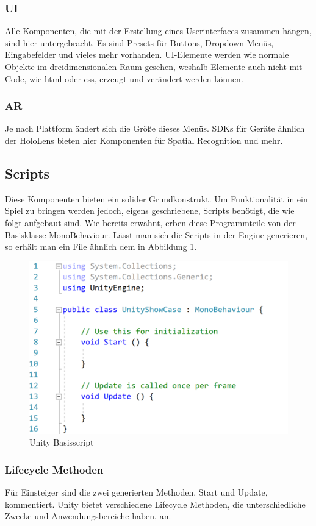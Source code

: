 \subsubsection{UI}
Alle Komponenten, die mit der Erstellung eines Userinterfaces zusammen hängen, sind hier untergebracht. Es sind Presets für Buttons, Dropdown Menüs, Eingabefelder und vieles mehr vorhanden. UI-Elemente werden wie normale Objekte im dreidimensionalen Raum gesehen, weshalb Elemente auch nicht mit Code, wie html oder css, erzeugt und verändert werden können. 
\subsubsection{AR}
Je nach Plattform ändert sich die Größe dieses Menüs. SDKs für Geräte ähnlich der HoloLens bieten hier Komponenten für Spatial Recognition und mehr. 
\subsection{Scripts}
Diese Komponenten bieten ein solider Grundkonstrukt. Um Funktionalität in ein Spiel zu bringen werden jedoch, eigens geschriebene, Scripts benötigt, die wie folgt aufgebaut sind.
Wie bereits erwähnt, erben diese Programmteile von der Basisklasse MonoBehaviour. Lässt man sich die Scripts in der Engine generieren, so erhält man ein File ähnlich dem in Abbildung \ref{img:unity-basescript}.
\begin{figure}
    \includegraphics[scale=0.8]{images/unityScriptBase.png}
    \caption{Unity Basisscript}
    \label{img:unity-basescript}
\end{figure}
\subsubsection{Lifecycle Methoden}
Für Einsteiger sind die zwei generierten Methoden, Start und Update, kommentiert. Unity bietet verschiedene Lifecycle Methoden, die unterschiedliche Zwecke und Anwendungsbereiche haben, an.
